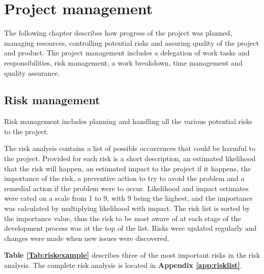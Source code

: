 
\chapter{Project management}

The following chapter describes how progress of the project was planned, managing resources, controlling potential risks and assuring quality of the project and product. The project management includes a delegation of work tasks and responsibilities, risk management, a work breakdown, time management and quality assurance.

\section{Risk management}
\label{sec:risk_management}

Risk management includes planning and handling all the various potential risks to the project.\newline

The risk analysis contains a list of possible occurrences that could be harmful to the project. Provided for each risk is a short description, an estimated likelihood that the risk will happen, an estimated impact to the project if it happens, the importance of the risk, a preventive action to try to avoid the problem and a remedial action if the problem were to occur. Likelihood and impact estimates were rated on a scale from 1 to 9, with 9 being the highest, and the importance was calculated by multiplying likelihood with impact. The risk list is sorted by the importance value, thus the risk to be most aware of at each stage of the development process was at the top of the list. Risks were updated regularly and changes were made when new issues were discovered.\newline

\textbf{Table \ref{Tab:riskexample}} describes three of the most important risks in the risk analysis. The complete risk analysis is located in \textbf{Appendix \ref{app:risklist}}.


